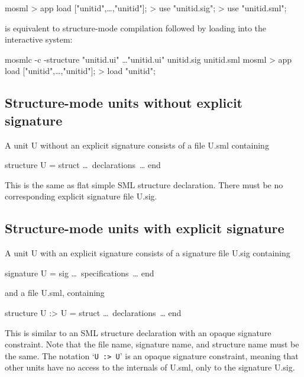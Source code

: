 \documentclass[fleqn,a4paper]{article}
\begin{document}
\begin{program}
mosml
> app load ["unitid\et",\ldots,"unitid\n"];
> use "unitid.sig";
> use "unitid.sml";
\end{program}

\noindent is equivalent to structure-mode compilation followed by
loading into the interactive system:

\begin{program}
mosmlc -c -structure "unitid\et.ui" \ldots "unitid\n.ui" unitid.sig unitid.sml 
mosml
> app load ["unitid\et",\ldots,"unitid\n"];
> load "unitid";
\end{program}



\subsection{Structure-mode units without explicit signature}
\label{sec-units-without}

A unit U without an explicit signature consists of a file U.sml
containing 

\begin{program}
structure U = struct {\rm \ldots\ declarations\ \ldots} end
\end{program}

\noindent This is the same as flat simple SML structure declaration.
There must be no corresponding explicit signature file U.sig.


\subsection{Structure-mode units with explicit signature}
\label{sec-units-with}

A unit U with an explicit signature consists of a signature file
U.sig containing

\begin{program}
signature U = sig {\rm \ldots\ specifications\ \ldots} end
\end{program}

\noindent and a file U.sml, containing

\begin{program}
structure U :> U = struct {\rm \ldots\ declarations\ \ldots} end
\end{program}

\noindent This is similar to an SML structure declaration with an
opaque signature constraint.  Note that the file name, signature name,
and structure name must be the same.  The notation `{\tt U :> U}' is
an opaque signature constraint, meaning that other units have no
access to the internals of U.sml, only to the signature U.sig.
\end{document}
